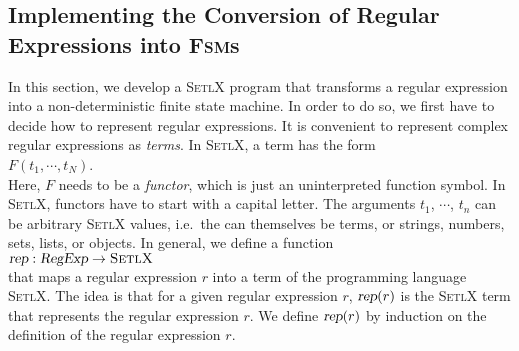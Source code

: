 \subsection{Implementing the Conversion of Regular Expressions into \textsc{Fsm}s}
In this section, we develop a \textsc{SetlX} program that transforms a regular expression
into a non-deterministic finite state machine.  In order to do so, we first have to decide
how to represent regular expressions.  It is convenient to represent complex regular expressions as
\emph{terms}.  In \textsc{SetlX}, a term has the form
\\[0.2cm]
\hspace*{1.3cm}
$F(t_1, \cdots, t_N)$.
\\[0.2cm]
Here, $F$ needs to be a \emph{functor}, which is just an uninterpreted function symbol.
In \textsc{SetlX}, functors have to start with a capital letter.  The arguments
 $t_1$, $\cdots$, $t_n$ can be arbitrary \textsc{SetlX} values, i.e.~the can themselves be terms, or strings,
 numbers, sets, lists, or objects.  In general, we define a function
\\[0.2cm]
\hspace*{1.3cm}
$\textsl{rep}: \textsl{RegExp} \rightarrow \textsc{SetlX}$
\\[0.2cm]
that maps a regular expression $r$ into a term of the programming language
\textsc{SetlX}.  The idea is that for a given regular expression $r$, $\textsl{rep}(r)$ is
the \textsc{SetlX} term that represents the regular expression $r$.  
We define $\textsl{rep}(r)$ by induction on the definition of the regular
expression $r$.
